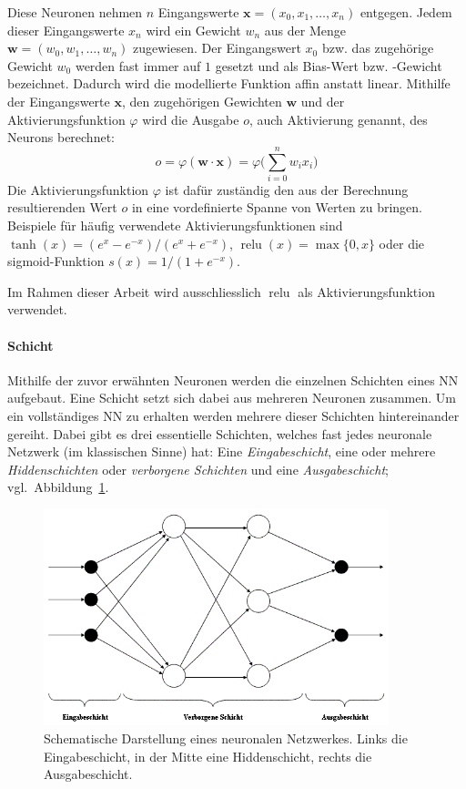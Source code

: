 Diese Neuronen nehmen $n$ Eingangswerte $\mathbf{x} = (x_0, x_1, \dots, x_n)$ entgegen. Jedem dieser Eingangswerte $x_n$ wird ein Gewicht $w_n$ aus der Menge $\mathbf{w} = (w_0, w_1, \dots, w_n)$ zugewiesen. Der Eingangswert $x_0$ bzw. das zugehörige Gewicht $w_0$ werden fast immer auf $1$ gesetzt und als Bias-Wert bzw. -Gewicht bezeichnet. Dadurch wird die modellierte Funktion affin anstatt linear. Mithilfe der Eingangswerte $\mathbf{x}$, den zugehörigen Gewichten $\mathbf{w}$ und der Aktivierungsfunktion $\varphi$ wird die Ausgabe $o$, auch Aktivierung genannt, des Neurons berechnet:
\begin{equation}
o = \varphi(\mathbf{w} \cdot \mathbf{x}) = \varphi\bigg(\sum_{i=0}^{n} w_i x_i\bigg)
\label{basics:neural_network:compute_equation}
\end{equation}
Die Aktivierungsfunktion $\varphi$ ist dafür zuständig den aus der Berechnung resultierenden Wert $o$ in eine vordefinierte Spanne von Werten zu bringen. Beispiele für häufig verwendete Aktivierungsfunktionen sind $\tanh(x) = (e^x - e^{-x})/(e^x + e^{-x})$, $\operatorname{relu}(x) = \max\{0,x\}$ oder die sigmoid-Funktion $s(x) = 1/(1 + e^{-x})$.

Im Rahmen dieser Arbeit wird ausschliesslich $\operatorname{relu}$ als Aktivierungsfunktion verwendet.

\paragraph{Schicht}\label{basic:neural_network:layer} Mithilfe der zuvor erwähnten Neuronen werden die einzelnen Schichten eines NN aufgebaut. Eine Schicht setzt sich dabei aus mehreren Neuronen zusammen. Um ein vollständiges NN zu erhalten werden mehrere dieser Schichten hintereinander gereiht. Dabei gibt es drei essentielle Schichten, welches fast jedes neuronale Netzwerk (im klassischen Sinne) hat: Eine \emph{Eingabeschicht}, eine oder mehrere \emph{Hiddenschichten} oder \emph{verborgene Schichten} und eine \emph{Ausgabeschicht}; vgl.\ Abbildung~\ref{fig:schichten}.

\begin{figure}[h]
  \centering
  \includegraphics[width=10cm]{img/basic_neural_network}
  \caption{Schematische Darstellung eines neuronalen Netzwerkes. Links die Eingabeschicht, in der Mitte eine Hiddenschicht, rechts die Ausgabeschicht.}
  \label{fig:schichten}
\end{figure}

